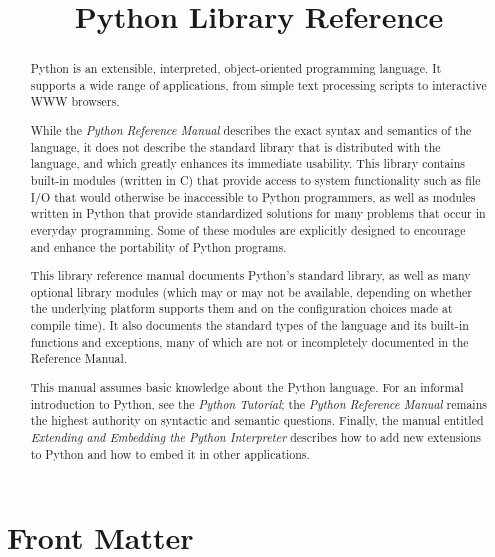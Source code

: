 \documentclass{manual}
\title{Python Library Reference}
\begin{document}
\maketitle

\ifhtml
\chapter*{Front Matter\label{front}}
\fi



\begin{abstract}

\noindent
Python is an extensible, interpreted, object-oriented programming
language.  It supports a wide range of applications, from simple text
processing scripts to interactive WWW browsers.

While the \emph{Python Reference Manual} describes the exact syntax and
semantics of the language, it does not describe the standard library
that is distributed with the language, and which greatly enhances its
immediate usability.  This library contains built-in modules (written
in C) that provide access to system functionality such as file I/O
that would otherwise be inaccessible to Python programmers, as well as
modules written in Python that provide standardized solutions for many
problems that occur in everyday programming.  Some of these modules
are explicitly designed to encourage and enhance the portability of
Python programs.

This library reference manual documents Python's standard library, as
well as many optional library modules (which may or may not be
available, depending on whether the underlying platform supports them
and on the configuration choices made at compile time).  It also
documents the standard types of the language and its built-in
functions and exceptions, many of which are not or incompletely
documented in the Reference Manual.

This manual assumes basic knowledge about the Python language.  For an
informal introduction to Python, see the \emph{Python Tutorial}; the
\emph{Python Reference Manual} remains the highest authority on
syntactic and semantic questions.  Finally, the manual entitled
\emph{Extending and Embedding the Python Interpreter} describes how to
add new extensions to Python and how to embed it in other applications.

\end{abstract}

\tableofcontents
\end{document}
